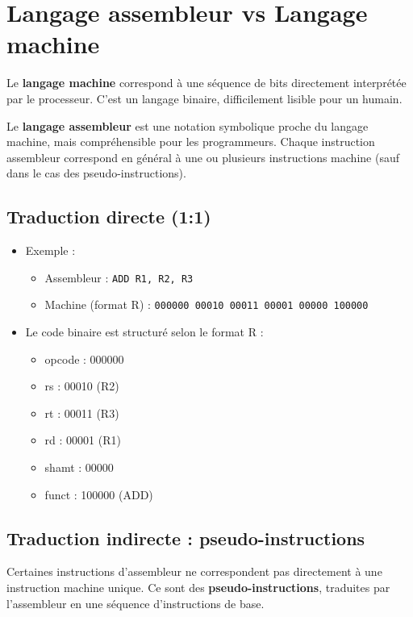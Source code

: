 \documentclass[12pt,a4paper]{article}
\begin{document}
\section{Langage assembleur vs Langage machine}
Le \textbf{langage machine} correspond à une séquence de bits directement interprétée par le processeur. C’est un langage binaire, difficilement lisible pour un humain.

Le \textbf{langage assembleur} est une notation symbolique proche du langage machine, mais compréhensible pour les programmeurs. Chaque instruction assembleur correspond en général à une ou plusieurs instructions machine (sauf dans le cas des pseudo-instructions).

\subsection{Traduction directe (1:1)}
\begin{itemize}
    \item Exemple :
    \begin{itemize}
        \item Assembleur : \texttt{ADD R1, R2, R3}
        \item Machine (format R) : \texttt{000000 00010 00011 00001 00000 100000}
    \end{itemize}
    \item Le code binaire est structuré selon le format R :
    \begin{itemize}
        \item opcode : 000000
        \item rs : 00010 (R2)
        \item rt : 00011 (R3)
        \item rd : 00001 (R1)
        \item shamt : 00000
        \item funct : 100000 (ADD)
    \end{itemize}
\end{itemize}

\subsection{Traduction indirecte : pseudo-instructions}
Certaines instructions d’assembleur ne correspondent pas directement à une instruction machine unique. Ce sont des \textbf{pseudo-instructions}, traduites par l’assembleur en une séquence d’instructions de base.
\end{document}
